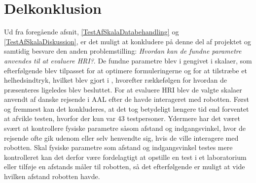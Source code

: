 \chapter{Delkonklusion}
\label{TestAfSkalaDelKonklusion}
%
Ud fra foregående afsnit, \autoref{TestAfSkalaDatabehandling} og \autoref{TestAfSkalaDiskussion}, er det muligt at konkludere på denne del af projektet og samtidig besvare den anden problemstilling: \textit{Hvordan kan de fundne parametre anvendes til at evaluere HRI?}. De fundne parametre blev i  gengivet i skalaer, som efterfølgende blev tilpasset for at optimere formuleringerne og for at tilstræbe et helhedsindtryk, hvilket blev gjort i , hvorefter rækkefølgen for hvordan de præsenteres ligeledes blev besluttet. For at evaluere HRI blev de valgte skalaer anvendt af danske rejsende i AAL efter de havde interageret med robotten.\blankline 
%
Først og fremmest kan det konkluderes, at det tog betydeligt længere tid end forventet at afvikle testen, hvorfor der kun var 43 testpersoner. Ydermere har det været svært at kontrollere fysiske parametre såsom afstand og indgangsvinkel, hvor de rejsende ofte gik udenom eller selv henvendte sig, hvis de ville interagere med robotten. Skal fysiske parametre som afstand og indgangsvinkel testes mere kontrolleret kan det derfor være fordelagtigt at opstille en test i et laboratorium eller tilføje en afstands måler til robotten, så det efterfølgende er muligt at vide hvilken afstand robotten havde.

